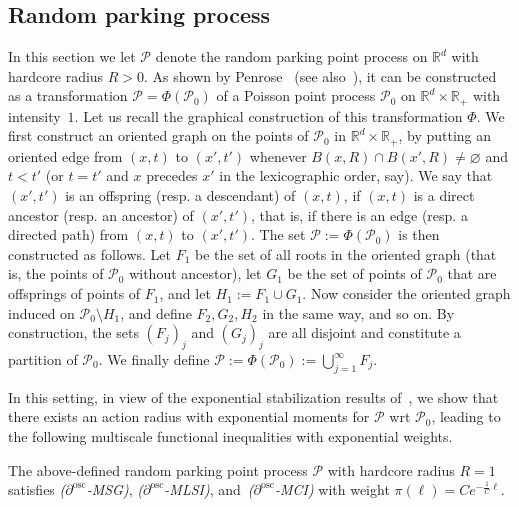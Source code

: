 \documentclass[10pt]{amsart}
\theoremstyle{definition}\newtheorem{defi}[theo]{Definition}\newtheorem{rema}[theo]{Remark}\newtheorem{exam}[theo]{Example}\newtheorem{exem}[theo]{Example}\newtheorem{nota}[theo]{Notation}
\newcommand{\R}{\mathbb R}
\newcommand{\Pc}{\mathcal P}
\newcommand{\osc}{\partial^{\mathrm{osc}}}
\begin{document}
\subsection{Random parking process}\label{chap:RPM}
In this section we let $\Pc$ denote the random parking point process on $\R^d$ with hardcore radius $R>0$. As shown by Penrose~\cite{Penrose-01} (see also~\cite[Section~2.1]{Gloria-Penrose-13}), it can be constructed as a transformation $\Pc=\Phi(\Pc_0)$ of a Poisson point process $\Pc_0$ on $\R^d\times\R_+$ with intensity~$1$. Let us recall the graphical construction of this transformation $\Phi$. We first construct an oriented graph on the points of $\Pc_0$ in $\R^d\times\R_+$, by putting an oriented edge from $(x,t)$ to $(x',t')$ whenever $B(x,R)\cap B(x',R)\ne\varnothing$ and $t<t'$ (or $t=t'$ and $x$ precedes $x'$ in the lexicographic order, say). We say that $(x',t')$ is an offspring (resp. a descendant) of $(x,t)$, if $(x,t)$ is a direct ancestor (resp. an ancestor) of $(x',t')$, that is, if there is an edge (resp. a directed path) from $(x,t)$ to $(x',t')$. The set $\Pc:=\Phi(\Pc_0)$ is then constructed as follows. Let $F_1$ be the set of all roots in the oriented graph (that is, the points of $\Pc_0$ without ancestor), let $G_1$ be the set of points of $\Pc_0$ that are offsprings of points of $F_1$, and let $H_1:=F_1\cup G_1$. Now consider the oriented graph induced on $\Pc_0\setminus H_1$, and define $F_2,G_2,H_2$ in the same way, and so on. By construction, the sets $(F_j)_j$ and $(G_j)_j$ are all disjoint and constitute a partition of $\Pc_0$. We finally define $\Pc:=\Phi(\Pc_0):=\bigcup_{j=1}^\infty F_j$.

In this setting, in view of the exponential stabilization results of~\cite{Schreiber-Penrose-Yukich-07}, we show that there exists an action radius with exponential moments for $\Pc$ wrt $\Pc_0$, leading to the following multiscale functional inequalities with exponential weights.

\begin{prop}\label{prop:rpm}
The above-defined random parking point process $\Pc$ with hardcore radius $R=1$ satisfies
\emph{($\osc$-MSG)}, \emph{($\osc$-MLSI)}, and~\emph{($\osc$-MCI)} with weight $\pi(\ell)=Ce^{-\frac1{C}\ell}$.
\end{prop}
\end{document}
